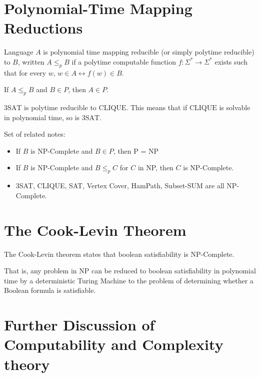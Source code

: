     \section{Polynomial-Time Mapping Reductions}
        Language $A$ is polynomial time mapping reducible (or simply polytime
        reducible) to $B$, written $A \le_p B$ if a polytime computable function
        $f : \Sigma^* \to \Sigma^*$ exists such that for every $w$,
        $w \in A \leftrightarrow f(w) \in B$.

        If $A \le_p B$ and $B \in P$, then $A \in P$.

        $\mbox{3SAT}$ is polytime reducible to $\mbox{CLIQUE}$. This means that
        if $\mbox{CLIQUE}$ is solvable in polynomial time, so is $\mbox{3SAT}$.

        Set of related notes:
        \begin{itemize}
            \item If $B$ is NP-Complete and $B \in P$, then P = NP
            \item If $B$ is NP-Complete and $B \le_p C$ for $C$ in NP, then $C$
            is NP-Complete.
            \item 3SAT, CLIQUE, SAT, Vertex Cover, HamPath, Subset-SUM are all
            NP-Complete.
        \end{itemize}

    \section{The Cook-Levin Theorem}
        The Cook-Levin theorem states that boolean satisfiability is
        NP-Complete.

        That is, any problem in NP can be reduced to boolean satisfiability in
        polynomial time by a deterministic Turing Machine to the problem of
        determining whether a Boolean formula is satisfiable.
    \section{Further Discussion of Computability and Complexity theory}
